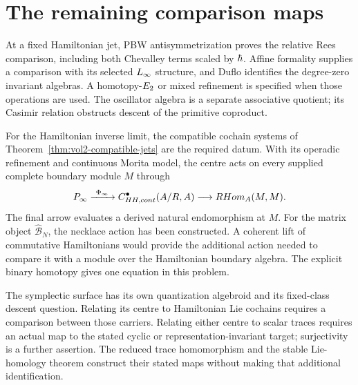 \section{The remaining comparison maps}
At a fixed Hamiltonian jet, PBW antisymmetrization proves the relative
Rees comparison, including both Chevalley terms scaled by $\hbar$.
Affine formality supplies a comparison with its selected $L_\infty$
structure, and Duflo
identifies the degree-zero invariant algebras.  A homotopy-$E_2$
or mixed refinement is specified when those operations are used.
The oscillator algebra is a separate associative quotient; its
Casimir relation obstructs descent of the primitive coproduct.

For the Hamiltonian inverse limit, the compatible cochain systems
of Theorem~\ref{thm:vol2-compatible-jets} are the required datum.
With its operadic refinement and continuous Morita model, the
centre acts on every supplied complete boundary module $M$ through
\[
 P_\infty
 \xrightarrow{\ \Phi_\infty\ }
 C^\bullet_{HH,cont}(A/R,A)
 \longrightarrow RHom_{A}(M,M).
\]
The final arrow evaluates a derived natural endomorphism at $M$.
For the matrix object $\widehat{\mathcal B}_N$, the necklace action
has been constructed.  A coherent lift of commutative Hamiltonians
would provide the additional action needed to compare it with a
module over the Hamiltonian boundary algebra.
The explicit binary homotopy gives one equation in this problem.

The symplectic surface has its own quantization algebroid and its
fixed-class descent question.  Relating its centre to Hamiltonian
Lie cochains requires a comparison between those carriers.
Relating either centre to scalar traces requires an actual map to
the stated cyclic or representation-invariant target; surjectivity
is a further assertion.  The reduced trace homomorphism and the
stable Lie-homology theorem construct their stated maps without
making that additional identification.

